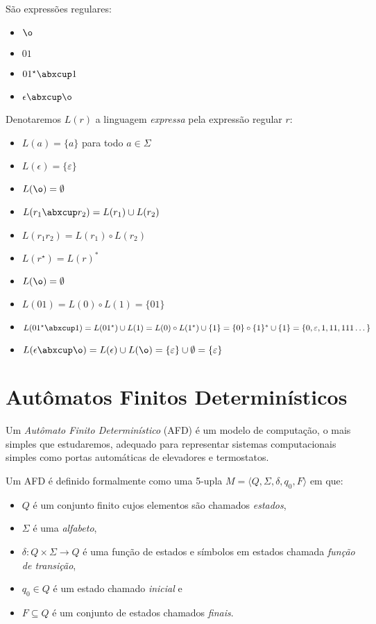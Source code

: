 \begin{example}
  São expressões regulares:
\begin{itemize}
\item[] $\o$
\item[] $01$
\item[] $01^\star\abxcup 1$
\item[] $\epsilon \abxcup \o$
\end{itemize}
\end{example}

Denotaremos $L(r)$ a linguagem {\em expressa} pela expressão regular $r$:
\begin{itemize}
\item[] $L(a) = \{a\}$ para todo $a \in \Sigma$
\item[] $L(\epsilon) = \{\varepsilon\}$
\item[] $L(\o) = \emptyset$
\item[] $L(r_1 \abxcup r_2) = L(r_1) \cup L(r_2)$
\item[] $L(r_1r_2) = L(r_1) \circ L(r_2)$
\item[] $L(r^\star) = L(r)^*$
\end{itemize}


\begin{example}
  \begin{itemize}
  \item[] $L(\o) = \emptyset$
  \item[] $L(01) = L(0) \circ L(1) = \{01\}$
  \item[] $L(01^\star\abxcup 1) = L(01^\star) \cup L(1) = L(0) \circ L(1^\star) \cup \{1\} = \{0\}\circ\{1\}^* \cup \{1\} = \{0, \varepsilon, 1, 11, 111 \dots\}$
  \item[] $L(\epsilon \abxcup \o) = L(\epsilon) \cup L(\o) = \{\varepsilon\} \cup \emptyset = \{\varepsilon\}$
\end{itemize}
\end{example}


\section{Autômatos Finitos Determinísticos}
\label{sec:afd}

Um {\em Autômato Finito Determinístico} (AFD) é um modelo de computação, o mais simples que estudaremos, adequado para representar sistemas computacionais simples como portas automáticas de elevadores e termostatos.

Um AFD é definido formalmente como uma 5-upla $M = \langle Q, \Sigma, \delta, q_0, F \rangle$ em que:
\begin{itemize}
\item[] $Q$ é um conjunto finito cujos elementos são chamados {\em estados},
\item[] $\Sigma$ é uma {\em alfabeto},
\item[] $\delta: Q \times \Sigma \to Q$ é uma função de estados e símbolos em estados chamada {\em função de transição},
\item[] $q_0 \in Q$ é um estado chamado {\em inicial} e
\item[] $F \subseteq Q$ é um conjunto de estados chamados {\em finais}.
\end{itemize}

